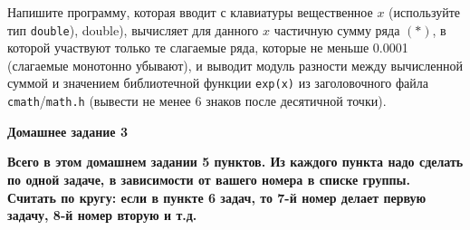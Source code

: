 \documentclass{article}
\begin{document}
\begin{enumerate}
Напишите программу, которая вводит с клавиатуры вещественное $x$ (используйте тип \texttt{double}), double), вычисляет для данного $x$ частичную сумму ряда $(*)$, в которой участвуют только те слагаемые ряда, которые не меньше 0.0001 (слагаемые монотонно убывают), и выводит модуль разности между вычисленной суммой и значением библиотечной функции \texttt{exp(x)} из заголовочного файла \texttt{cmath}/\texttt{math.h}  (вывести не менее 6 знаков после десятичной точки).

\end{enumerate}



\begin{center}
\bf\Large  Домашнее задание 3
\end{center}

\noindent 
\textbf{Всего в этом домашнем задании 5 пунктов. Из каждого пункта надо сделать по одной задаче, в зависимости от вашего номера в списке группы. Считать по кругу: если в пункте 6 задач, то 7-й номер делает первую задачу, 8-й номер вторую и т.д.}

\medskip
\noindent 
\end{document}
